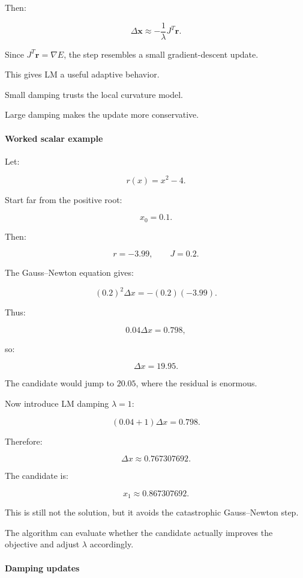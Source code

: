 Then:

\[
\Delta\mathbf x\approx-\frac1\lambda J^T\mathbf r.
\]

Since \(J^T\mathbf r=\nabla E\), the step resembles a small gradient-descent update.

This gives LM a useful adaptive behavior.

Small damping trusts the local curvature model.

Large damping makes the update more conservative.

\paragraph{Worked scalar example}\label{02-foundations-ii-ch027-worked-scalar-example}

Let:

\[
r(x)=x^2-4.
\]

Start far from the positive root:

\[
x_0=0.1.
\]

Then:

\[
r=-3.99,\qquad J=0.2.
\]

The Gauss--Newton equation gives:

\[
(0.2)^2\Delta x=-(0.2)(-3.99).
\]

Thus:

\[
0.04\Delta x=0.798,
\]

so:

\[
\boxed{\Delta x=19.95}.
\]

The candidate would jump to \(20.05\), where the residual is enormous.

Now introduce LM damping \(\lambda=1\):

\[
(0.04+1)\Delta x=0.798.
\]

Therefore:

\[
\boxed{ \Delta x\approx0.767307692 }.
\]

The candidate is:

\[
x_1\approx0.867307692.
\]

This is still not the solution, but it avoids the catastrophic Gauss--Newton step.

The algorithm can evaluate whether the candidate actually improves the objective and adjust \(\lambda\) accordingly.

\paragraph{Damping updates}\label{02-foundations-ii-ch027-damping-updates}

